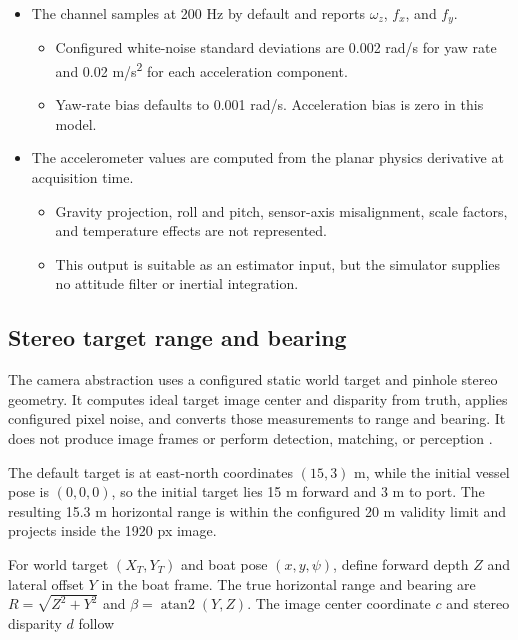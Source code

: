 \documentclass[10pt,letterpaper]{article}
\begin{document}
\begin{itemize}
\item
  The channel samples at 200 Hz by default and reports \(\omega_{z}\), \(f_{x}\), and \(f_{y}\).

  \begin{itemize}
  \item
    Configured white-noise standard deviations are 0.002 rad/s for yaw rate and 0.02 m/s\textsuperscript{2} for each acceleration component.
  \item
    Yaw-rate bias defaults to 0.001 rad/s. Acceleration bias is zero in this model.
  \end{itemize}
\item
  The accelerometer values are computed from the planar physics derivative at acquisition time.

  \begin{itemize}
  \item
    Gravity projection, roll and pitch, sensor-axis misalignment, scale factors, and temperature effects are not represented.
  \item
    This output is suitable as an estimator input, but the simulator supplies no attitude filter or inertial integration.
  \end{itemize}
\end{itemize}

\subsection{Stereo target range and bearing}

The camera abstraction uses a configured static world target and pinhole stereo geometry. It computes ideal target image center and disparity from truth, applies configured pixel noise, and converts those measurements to range and bearing. It does not produce image frames or perform detection, matching, or perception \cite{Stereolabs2026ZEDX}.

The default target is at east-north coordinates \((15,3)\) m, while the initial vessel pose is \((0,0,0)\), so the initial target lies 15 m forward and 3 m to port. The resulting 15.3 m horizontal range is within the configured 20 m validity limit and projects inside the 1920 px image.

For world target \(\left( X_{T},Y_{T} \right)\) and boat pose \((x,y,\psi)\), define forward depth \(Z\) and lateral offset \(Y\) in the boat frame. The true horizontal range and bearing are \(R = \sqrt{Z^{2} + Y^{2}}\) and \(\beta = \operatorname{atan2}(Y,Z)\). The image center coordinate \(c\) and stereo disparity \(d\) follow
\end{document}
